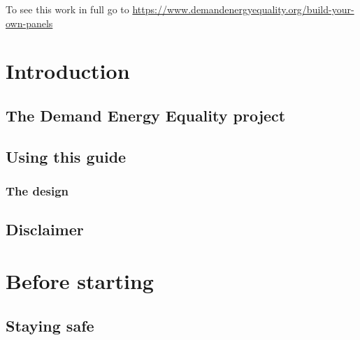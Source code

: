 \documentclass{article}
\theoremstyle{definition}
\theoremstyle{definition}
\theoremstyle{remark}
\begin{document}
    To see this work in full go to \href{https://www.demandenergyequality.org/build-your-own-panels}{https://www.demandenergyequality.org/build-your-own-panels}
  


\newpage

\section{Introduction} %
\label{sec:introduction}

  \subsection{The Demand Energy Equality project} %
  \label{sub:the_demand_energy_equality_project}

  
  \subsection{Using this guide} %
  \label{sub:using_this_guide}


  \subsubsection{The design} %
  \label{ssub:the_design}
  
  
  \subsection{Disclaimer} %
  \label{sub:disclaimer}


  \newpage  


\section{Before starting} %
\label{sec:before_starting}

  \subsection{Staying safe} %
  \label{sub:staying_safe}
  
\end{document}
